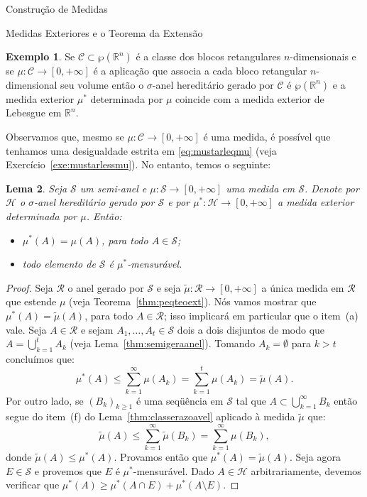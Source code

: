 \documentclass[oneside,final,11pt]{amsbook}
\newcommand{\R}{\mathds R}
\theoremstyle{remark}\newtheorem{exercise}{Exercício}[chapter]
\theoremstyle{remark}\newtheorem{*exercise}[exercise]{\hbox to 0pt{\hskip 0pt minus 1fil*}Exercício}
\theoremstyle{definition}\newtheorem{exdefin}{Definição}[chapter]
\theoremstyle{plain}\newtheorem{teo}{Teorema}[section]
\theoremstyle{plain}\newtheorem{lem}[teo]{Lema}
\theoremstyle{plain}\newtheorem{prop}[teo]{Proposição}
\theoremstyle{plain}\newtheorem{cor}[teo]{Corolário}
\theoremstyle{definition}\newtheorem{defin}[teo]{Definição}
\theoremstyle{remark}\newtheorem{rem}[teo]{Observação}
\theoremstyle{definition}\newtheorem{notation}[teo]{Notação}
\theoremstyle{definition}\newtheorem{convention}[teo]{Convenção}
\theoremstyle{definition}\newtheorem{example}[teo]{Exemplo}
\numberwithin{section}{chapter}
\numberwithin{equation}{section}
\begin{document}
\begin{chapter}{Construção de Medidas}
\begin{section}{Medidas Exteriores e o Teorema da Extensão}
\begin{example}
Se $\mathcal C\subset\wp(\R^n)$ é a classe dos blocos retangulares $n$-dimensionais e
se $\mu:\mathcal C\to[0,+\infty]$ é a aplicação que associa a cada bloco retangular $n$-dimensional seu volume
então o $\sigma$-anel hereditário gerado por $\mathcal C$ é $\wp(\R^n)$ e a medida exterior $\mu^*$
determinada por $\mu$ coincide com a medida exterior de Lebesgue em $\R^n$.
\end{example}

Observamos que, mesmo se $\mu:\mathcal C\to[0,+\infty]$ é uma medida, é possível que tenhamos uma desigualdade
estrita em \eqref{eq:mustarleqmu} (veja Exercício~\ref{exe:mustarlessmu}). No entanto, temos o seguinte:
\begin{lem}\label{thm:mustarehmunoS}
Seja $\mathcal S$ um semi-anel e $\mu:\mathcal S\to[0,+\infty]$ uma medida em $\mathcal S$.
Denote por $\mathcal H$ o $\sigma$-anel hereditário gerado por $\mathcal S$ e por
$\mu^*:\mathcal H\to[0,+\infty]$ a medida exterior determinada por $\mu$. Então:
\begin{itemize}
\item[(a)] $\mu^*(A)=\mu(A)$, para todo $A\in\mathcal S$;
\item[(b)] todo elemento de $\mathcal S$ é $\mu^*$-mensurável.
\end{itemize}
\end{lem}
\begin{proof}
Seja $\mathcal R$ o anel gerado por $\mathcal S$ e seja $\tilde\mu:\mathcal R\to[0,+\infty]$
a única medida em $\mathcal R$ que estende $\mu$ (veja Teorema~\ref{thm:peqteoext}).
Nós vamos mostrar que $\mu^*(A)=\tilde\mu(A)$, para todo $A\in\mathcal R$; isso implicará
em particular que o item~(a) vale. Seja $A\in\mathcal R$ e sejam $A_1,\ldots,A_t\in\mathcal S$
dois a dois disjuntos de modo que $A=\bigcup_{k=1}^tA_k$ (veja Lema~\ref{thm:semigeraanel}).
Tomando $A_k=\emptyset$ para $k>t$ concluímos que:
\[\mu^*(A)\le\sum_{k=1}^\infty\mu(A_k)=\sum_{k=1}^t\mu(A_k)=\tilde\mu(A).\]
Por outro lado, se $(B_k)_{k\ge1}$ é uma seqüência em $\mathcal S$ tal que
$A\subset\bigcup_{k=1}^\infty B_k$ então segue do item~(f) do Lema~\ref{thm:classerazoavel} aplicado
à medida $\tilde\mu$ que:
\[\tilde\mu(A)\le\sum_{k=1}^\infty\tilde\mu(B_k)=\sum_{k=1}^\infty\mu(B_k),\]
donde $\tilde\mu(A)\le\mu^*(A)$. Provamos então que $\mu^*(A)=\tilde\mu(A)$.
Seja agora $E\in\mathcal S$ e provemos que $E$ é $\mu^*$-mensurável. Dado $A\in\mathcal H$
arbitrariamente, devemos verificar que $\mu^*(A)\ge\mu^*(A\cap E)+\mu^*(A\setminus E)$.

\end{proof}
\end{section}
\end{chapter}
\end{document}
